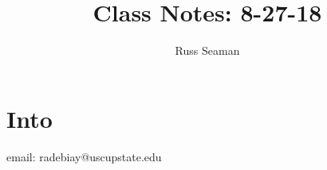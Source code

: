 \documentclass{article}
\author{Russ Seaman}
\title{Class Notes: 8-27-18}
\begin{document}
\section{Into}
email: radebiay@uscupstate.edu
\end{document}
